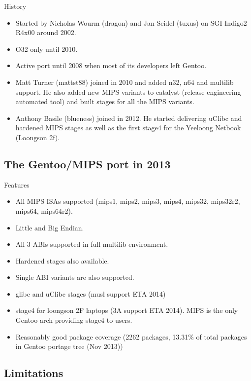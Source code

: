 \documentclass{beamer}
\begin{document}
\begin{frame}{History}
	\begin{itemize}
		\item Started by Nicholas Wourm (dragon) and Jan Seidel (tuxus) on SGI Indigo2 R4x00 around 2002.
		\item O32 only until 2010.
		\item Active port until 2008 when most of its developers left Gentoo.
		\item Matt Turner (mattst88) joined in 2010 and added n32, n64 and multilib support. He also added new MIPS variants to catalyst (release engineering automated tool) and built stages for all the MIPS
	variants.
		\item Anthony Basile (blueness) joined in 2012. He started delivering uClibc and hardened MIPS stages as well as the first stage4 for the Yeeloong Netbook (Loongson 2f).
	\end{itemize}
\end{frame}

\subsection{The Gentoo/MIPS port in 2013}

\begin{frame}{Features}
	\begin{itemize}
		\item All MIPS ISAs supported (mips1, mips2, mips3, mips4, mips32, mips32r2, mips64, mips64r2).
		\item Little and Big Endian.
		\item All 3 ABIs supported in full multilib environment.
		\item Hardened stages also available.
		\item Single ABI variants are also supported.
		\item glibc and uClibc stages (musl support ETA 2014)
		\item stage4 for loongson 2F laptops (3A support ETA 2014). MIPS is the only Gentoo arch providing stage4 to users.
		\item Reasonably good package coverage (2262 packages, 13.31\% of total packages in Gentoo portage tree (Nov 2013))
	\end{itemize}
\end{frame}

\subsection{Limitations}
\end{document}
